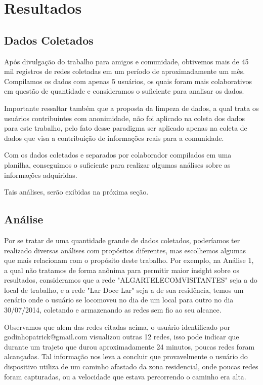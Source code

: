 \documentclass[12pt, %
openright, 
oneside,
a4paper,
brazil]{facom-ufu-abntex2}
\begin{document}
\chapter{Resultados}
\section{Dados Coletados}
Após divulgação do trabalho para amigos e comunidade, obtivemos mais de 45 mil registros de redes coletadas em um período de aproximadamente um mês. Compilamos os dados com apenas 5 usuários, os quais foram mais colaborativos em questão de quantidade e consideramos o suficiente para analisar os dados.

Importante ressaltar também que a proposta da limpeza de dados, a qual trata os usuários contribuintes com anonimidade, não foi aplicado na coleta dos dados para este trabalho, pelo fato desse paradigma ser aplicado apenas na coleta de dados que visa a contribuição de informações reais para a comunidade.

Com os dados coletados e separados por colaborador compilados em uma planilha, conseguimos o suficiente para realizar algumas análises sobre as informações adquiridas. 

 Tais análises, serão exibidas na próxima seção.

\section{Análise}
Por se tratar de uma quantidade grande de dados coletados, poderíamos ter realizado diversas análises com propósitos diferentes, mas escolhemos algumas que mais relacionam com o propósito deste trabalho. Por exemplo, na Análise 1, a qual não tratamos de forma anônima para permitir maior insight sobre os resultados, consideramos que a rede "ALGARTELECOMVISITANTES"  seja a do local de trabalho, e a rede "Lar Doce Lar" seja a de sua residência, temos um cenário onde o usuário se locomoveu no dia  de um local para outro no dia 30/07/2014, coletando e armazenando as redes sem fio ao seu alcance.


Observamos que alem das redes citadas acima, o usuário identificado por godinhopatrick@gmail.com visualizou outras 12 redes, isso pode indicar que durante um trajeto que durou aproximadamente 24 minutos, poucas redes foram alcançadas. Tal informação nos leva a concluir que provavelmente o usuário do dispositivo utiliza de um caminho afastado da zona residencial, onde poucas redes foram capturadas, ou a velocidade que estava percorrendo o caminho era alta. 
 
\end{document}
